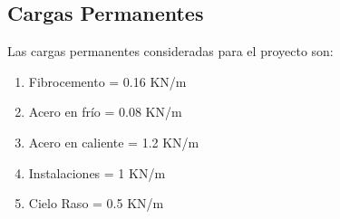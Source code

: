 \documentclass{article}
\begin{document}



\subsection{Cargas Permanentes}
Las cargas permanentes consideradas para el proyecto son:
\begin{enumerate}
    \item Fibrocemento = 0.16 KN/m
    \item Acero en frío = 0.08 KN/m
    \item Acero en caliente = 1.2 KN/m
    \item Instalaciones = 1 KN/m
    \item Cielo Raso = 0.5 KN/m
\end{enumerate}
\end{document}
